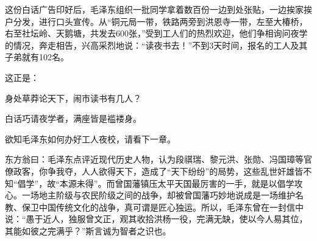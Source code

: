 \documentclass[../../dazhuan.tex]{subfiles}
\begin{document}
这份白话广告印好后，毛泽东组织一批同学拿着数百份一边到处张贴，一边挨家挨户分发，进行口头宣传。从“铜元局一带，铁路两旁到洪恩寺一带，左至大椿桥，右至社坛岭、天鹅塘，共发去600张，”受到工人们的热烈欢迎，他们争相询问夜学的情况，奔走相告，兴高采烈地说：“读夜书去！”不到3天时间，报名的工人及其子弟就有102名。

这正是：\begin{xemph}身处草莽论天下，闹市读书有几人？

\hspace{4em}白话巧请夜学者，满座皆是褴褛身。\end{xemph}


    欲知毛泽东如何办好工人夜校，请看下一章。

    东方翁曰：毛泽东点评近现代历史人物，认为段祺瑞、黎元洪、张勋、冯国璋等官僚政客，你争我夺，人人欲得天下，造成了“天下纷纷”的局势，这些乱世奸雄皆不知“倡学”，故“本源未得”。而曾国藩镇压太平天国最厉害的一手，就是以倡学攻心。一场地主阶级与农民阶级之间的战争，却被曾国藩巧妙地说成是一场维护名教、保卫中国传统文化的战争，真可谓是匠心独运。所以，毛泽东曾在一封信中说：“愚于近人，独服曾文正，观其收拾洪杨一役，完满无缺，使以今人易其位，其能如彼之完满乎？”斯言诚为智者之识也。
\end{document}
